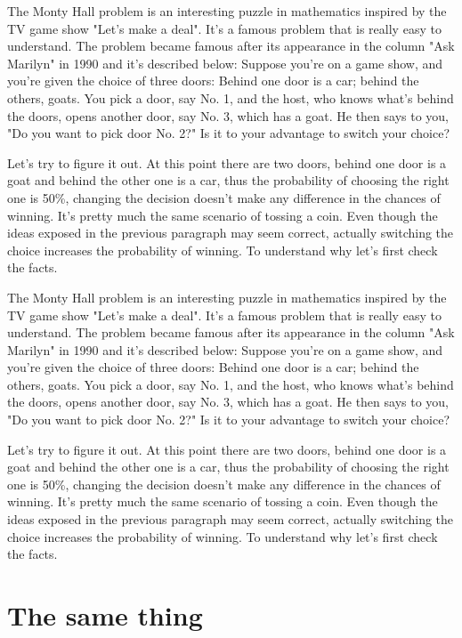 \documentclass{oscmjournal}
\begin{document}
The Monty Hall problem is an interesting puzzle in mathematics inspired by the TV  game show "Let's make a deal". It's a famous problem that is really easy to understand. The problem became famous after its appearance in the column "Ask Marilyn" in 1990 and  it's described below: Suppose you're on a game show, and you're given the choice of three doors: Behind one  door is a car; behind the others, goats. You pick a door, say No. 1, and the host, who  knows what's behind the doors, opens another door, say No. 3, which has a goat. He then  says to you, "Do you want to pick door No. 2?" Is it to your advantage to switch your choice?

Let's try to figure it out. At this point there are two doors, behind one door is a goat  and behind the other one is a car, thus the probability of choosing the right one is 50\%, changing the decision doesn't make any difference in the chances of winning. It's pretty much the same scenario of tossing a coin. Even though the ideas exposed in the previous paragraph may seem correct, actually switching the choice increases the probability of winning. To understand why let's  first check the facts.

The Monty Hall problem is an interesting puzzle in mathematics inspired by the TV  game show "Let's make a deal". It's a famous problem that is really easy to understand. The problem became famous after its appearance in the column "Ask Marilyn" in 1990 and  it's described below: Suppose you're on a game show, and you're given the choice of three doors: Behind one  door is a car; behind the others, goats. You pick a door, say No. 1, and the host, who  knows what's behind the doors, opens another door, say No. 3, which has a goat. He then  says to you, "Do you want to pick door No. 2?" Is it to your advantage to switch your choice?

Let's try to figure it out. At this point there are two doors, behind one door is a goat  and behind the other one is a car, thus the probability of choosing the right one is 50\%, changing the decision doesn't make any difference in the chances of winning. It's pretty much the same scenario of tossing a coin. Even though the ideas exposed in the previous paragraph may seem correct, actually switching the choice increases the probability of winning. To understand why let's  first check the facts.

\section{The same thing}
\end{document}
